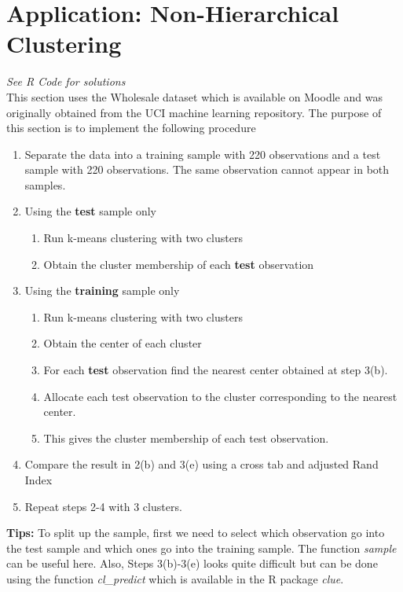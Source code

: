\documentclass{article}
\begin{document}
\section*{Application: Non-Hierarchical Clustering}
{\em See R Code for solutions}\\
This section uses the Wholesale dataset which is available on Moodle and was originally obtained from the UCI machine learning repository.  The purpose of this section is to implement the following procedure
\begin{enumerate}
	\item Separate the data into a training sample with 220 observations and a test sample  with  220 observations.   The  same  observation  cannot  appear  in both samples.
	\item  Using the {\bf test} sample only
	\begin{enumerate}
		\item Run k-means clustering with two clusters
		\item  Obtain the cluster membership of each {\bf test}
		observation
	\end{enumerate}
	\item  Using the {\bf training} sample only
	\begin{enumerate}
		\item Run k-means clustering with two clusters
		\item Obtain the center of each cluster
		\item For  each {\bf test} observation  find  the nearest  center  obtained  at  step 3(b).
		\item Allocate  each  test  observation  to  the  cluster  corresponding  to  the
		nearest center.
		\item This gives the cluster membership of each test observation.
	\end{enumerate}
	\item  Compare the result in 2(b) and 3(e) using a cross tab and adjusted Rand Index
    \item  Repeat steps 2-4 with 3 clusters.
\end{enumerate}
{\bf Tips:} To split up the sample, first we need to select which observation go into the test sample and which ones go into the training sample. The function {\em sample} can be useful here.  Also, Steps 3(b)-3(e) looks quite difficult but can be done using the function {\em cl\_predict}
which is available in the R package {\em clue}.
\end{document}
